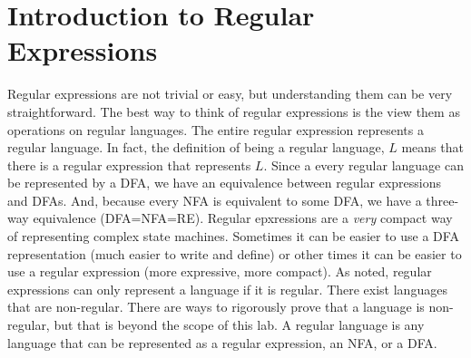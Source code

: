 \section*{Introduction to Regular Expressions}
Regular expressions are not trivial or easy, but understanding them can be very straightforward.
The best way to think of regular expressions is the view them as operations on regular languages.  
The entire regular expression represents a regular language.  
In fact, the definition of being a regular language, $L$ means that there is a regular expression that represents $L$.
Since a every regular language can be represented by a DFA, we have an equivalence between regular expressions and DFAs.
And, because every NFA is equivalent to some DFA, we have a three-way equivalence (DFA=NFA=RE).
Regular epxressions are a \emph{very} compact way of representing complex state machines.
Sometimes it can be easier to use a DFA representation (much easier to write and define) or other times it can be easier to use a regular expression (more expressive, more compact).
As noted, regular expressions can only represent a language if it is regular.
There exist languages that are non-regular.
There are ways to rigorously prove that a language is non-regular, but that is beyond the scope of this lab.
A regular language is any language that can be represented as a regular expression, an NFA, or a DFA.

